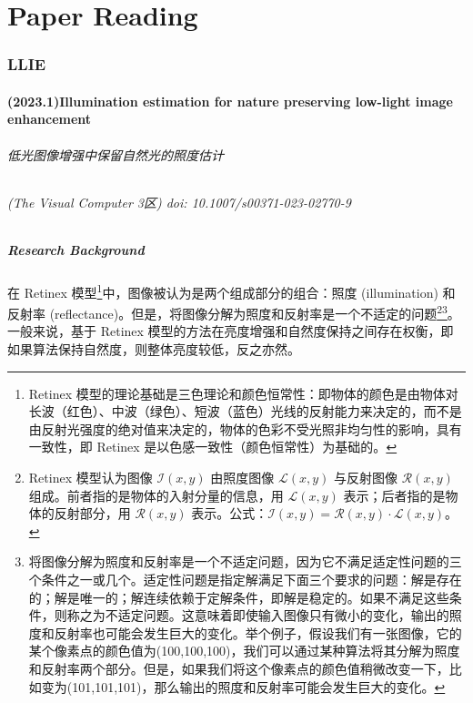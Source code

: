 \documentclass[letterpaper,10pt]{article}
\begin{document}
	
	\part{Paper Reading}
	
	\section{LLIE}
	
		\subsection{(2023.1)Illumination estimation for nature preserving low-light image enhancement}
		
		\paragraph{低光图像增强中保留自然光的照度估计}
		
		\paragraph{(The Visual Computer 3区) doi: 10.1007/s00371-023-02770-9}
		
			\subsubsection{Research Background}
			
			在 Retinex 模型\footnote{Retinex 模型的理论基础是三色理论和颜色恒常性：即物体的颜色是由物体对长波（红色）、中波（绿色）、短波（蓝色）光线的反射能力来决定的，而不是由反射光强度的绝对值来决定的，物体的色彩不受光照非均匀性的影响，具有一致性，即 Retinex 是以色感一致性（颜色恒常性）为基础的。}中，图像被认为是两个组成部分的组合：照度 (illumination) 和反射率 (reflectance)。但是，将图像分解为照度和反射率是一个不适定的问题\footnote{Retinex 模型认为图像 $\mathcal{I}(x,y)$ 由照度图像 $\mathcal{L}(x,y)$ 与反射图像 $\mathcal{R}(x,y)$ 组成。前者指的是物体的入射分量的信息，用 $\mathcal{L}(x,y)$ 表示；后者指的是物体的反射部分，用 $\mathcal{R}(x,y)$ 表示。公式：$\mathcal{I}(x,y)=\mathcal{R}(x,y) \cdot \mathcal{L}(x,y)$。}\footnote{将图像分解为照度和反射率是一个不适定问题，因为它不满足适定性问题的三个条件之一或几个。适定性问题是指定解满足下面三个要求的问题：解是存在的；解是唯一的；解连续依赖于定解条件，即解是稳定的。如果不满足这些条件，则称之为不适定问题。这意味着即使输入图像只有微小的变化，输出的照度和反射率也可能会发生巨大的变化。举个例子，假设我们有一张图像，它的某个像素点的颜色值为(100,100,100)，我们可以通过某种算法将其分解为照度和反射率两个部分。但是，如果我们将这个像素点的颜色值稍微改变一下，比如变为(101,101,101)，那么输出的照度和反射率可能会发生巨大的变化。}。一般来说，基于 Retinex 模型的方法在亮度增强和自然度保持之间存在权衡，即如果算法保持自然度，则整体亮度较低，反之亦然。
		
\end{document}
